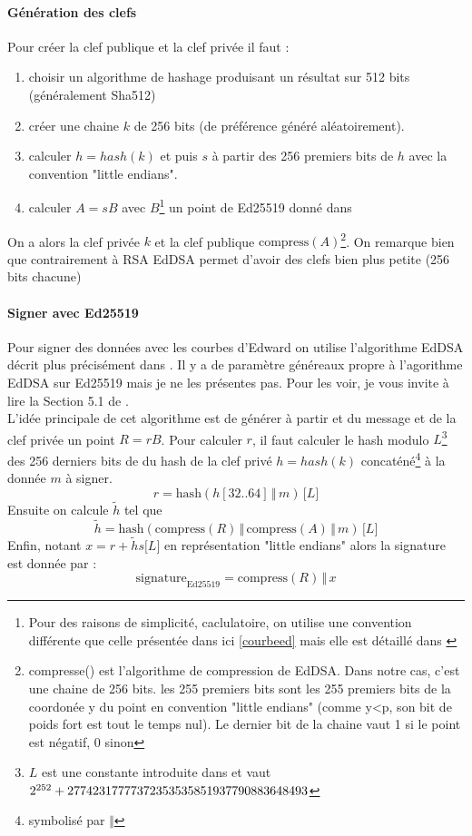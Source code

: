 \documentclass[a4paper, 12pt]{article}
\begin{document}
\paragraph{Génération des clefs}
\noindent Pour créer la clef publique et la clef privée il faut :
\begin{enumerate}
	\item choisir un algorithme de hashage produisant un résultat sur 512 bits (généralement Sha512)
	\item créer une chaine $k$ de 256 bits (de préférence généré aléatoirement).
	\item calculer $h = hash(k)$ et puis $s$ à partir des 256 premiers bits de $h$ avec la convention "little endians".
	\item calculer $A = sB$ avec $B$\footnote{Pour des raisons de simplicité, caclulatoire, on utilise une convention différente que celle présentée dans ici \ref{courbeed} mais elle est détaillé dans \cite{eddsa}} un point de Ed25519 donné dans \cite{eddsa}\\
\end{enumerate}

On a alors la clef privée $k$ et la clef publique $\text{compress}(A)$\footnote{compresse() est l'algorithme de compression de EdDSA. Dans notre cas, c'est une chaine de 256 bits. les 255 premiers bits sont les 255 premiers bits de la coordonée y du point en convention "little endians" (comme y<p, son bit de poids fort est tout le temps nul). Le dernier bit de la chaine vaut 1 si le point est négatif, 0 sinon}. On remarque bien que contrairement à RSA EdDSA permet d'avoir des clefs bien plus petite (256 bits chacune)
\paragraph{Signer avec Ed25519}
Pour signer des données avec les courbes d'Edward on utilise l'algorithme EdDSA décrit plus précisément dans \cite{eddsa}.
Il y a de paramètre généreaux propre à l'agorithme EdDSA sur Ed25519 mais je ne les présentes pas. Pour les voir, je vous invite à lire la Section 5.1 de \cite{eddsa}.\\

L'idée principale de cet algorithme est de générer à partir et du message et de la clef privée un point $R = rB$.
Pour calculer $r$, il faut calculer le hash modulo $L$\footnote{$L$ est une constante introduite dans \cite{eddsa} et vaut $2^{252}+2774231777737235353585193779088364\\8493$} des 256 derniers bits de du hash de la clef privé $h = hash(k)$ concaténé\footnote{symbolisé par $\Vert$} à la donnée $m$ à signer.
$$
r = \text{hash}\left(h[32..64] \, \Vert \, m\right) \, \lbrack L \rbrack
$$
Ensuite on calcule $\tilde{h}$ tel que
$$
\tilde{h} = \text{hash}\left(\text{compress}(R) \, \Vert \, \text{compress}(A) \, \Vert \, m\right) \, \lbrack L \rbrack
$$
Enfin, notant $x = r+\tilde{h}s \lbrack L \rbrack$ en représentation "little endians" alors la signature est donnée par :
$$
\text{signature}_{\text{Ed25519}} = \text{compress}(R) \, \Vert \, x
$$
\end{document}
